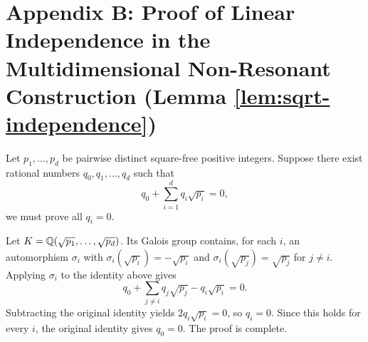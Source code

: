 ﻿\section{Appendix B: Proof of Linear Independence in the Multidimensional Non-Resonant Construction (Lemma \ref{lem:sqrt-independence})}
\label{app:multidim-indep}

Let $p_1,\dots,p_d$ be pairwise distinct square-free positive integers. Suppose there exist rational numbers $q_0,q_1,\dots,q_d$ such that
\[
q_0+\sum_{i=1}^d q_i\sqrt{p_i}=0,
\]
we must prove all $q_i=0$.

Let $K=\mathbb{Q}(\sqrt{p_1},\dots,\sqrt{p_d})$. Its Galois group contains, for each $i$, an automorphism $\sigma_i$ with $\sigma_i(\sqrt{p_i})=-\sqrt{p_i}$ and $\sigma_i(\sqrt{p_j})=\sqrt{p_j}$ for $j\neq i$. Applying $\sigma_i$ to the identity above gives
\[
q_0+\sum_{j\neq i}q_j\sqrt{p_j}-q_i\sqrt{p_i}=0.
\]
Subtracting the original identity yields $2q_i\sqrt{p_i}=0$, so $q_i=0$. Since this holds for every $i$, the original identity gives $q_0=0$. The proof is complete.
